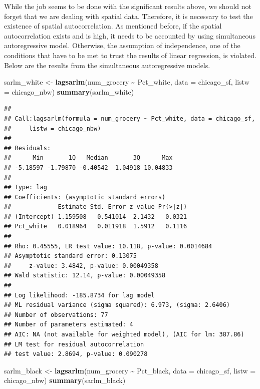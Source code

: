 \documentclass[
]{article}
\newenvironment{Shaded}{\begin{snugshade}}{\end{snugshade}}
\newcommand{\AttributeTok}[1]{\textcolor[rgb]{0.13,0.29,0.53}{#1}}
\newcommand{\FunctionTok}[1]{\textcolor[rgb]{0.13,0.29,0.53}{\textbf{#1}}}
\newcommand{\NormalTok}[1]{#1}
\newcommand{\OtherTok}[1]{\textcolor[rgb]{0.56,0.35,0.01}{#1}}
\newcommand{\SpecialCharTok}[1]{\textcolor[rgb]{0.81,0.36,0.00}{\textbf{#1}}}
\begin{document}
While the job seems to be done with the significant results above, we
should not forget that we are dealing with spatial data. Therefore, it
is necessary to test the existence of spatial autocorrelation. As
mentioned before, if the spatial autocorrelation exists and is high, it
needs to be accounted by using simultaneous autoregressive model.
Otherwise, the assumption of independence, one of the conditions that
have to be met to trust the results of linear regression, is violated.
Below are the results from the simultaneous autoregressive models.

\begin{Shaded}
\begin{Highlighting}[]
\NormalTok{sarlm\_white }\OtherTok{\textless{}{-}} \FunctionTok{lagsarlm}\NormalTok{(num\_grocery }\SpecialCharTok{\textasciitilde{}}\NormalTok{ Pct\_white, }\AttributeTok{data =}\NormalTok{ chicago\_sf, }\AttributeTok{listw =}\NormalTok{ chicago\_nbw)}
\FunctionTok{summary}\NormalTok{(sarlm\_white)}
\end{Highlighting}
\end{Shaded}

\begin{verbatim}
## 
## Call:lagsarlm(formula = num_grocery ~ Pct_white, data = chicago_sf, 
##     listw = chicago_nbw)
## 
## Residuals:
##      Min       1Q   Median       3Q      Max 
## -5.18597 -1.79870 -0.40542  1.04918 10.04833 
## 
## Type: lag 
## Coefficients: (asymptotic standard errors) 
##             Estimate Std. Error z value Pr(>|z|)
## (Intercept) 1.159508   0.541014  2.1432   0.0321
## Pct_white   0.018964   0.011918  1.5912   0.1116
## 
## Rho: 0.45555, LR test value: 10.118, p-value: 0.0014684
## Asymptotic standard error: 0.13075
##     z-value: 3.4842, p-value: 0.00049358
## Wald statistic: 12.14, p-value: 0.00049358
## 
## Log likelihood: -185.8734 for lag model
## ML residual variance (sigma squared): 6.973, (sigma: 2.6406)
## Number of observations: 77 
## Number of parameters estimated: 4 
## AIC: NA (not available for weighted model), (AIC for lm: 387.86)
## LM test for residual autocorrelation
## test value: 2.8694, p-value: 0.090278
\end{verbatim}

\begin{Shaded}
\begin{Highlighting}[]
\NormalTok{sarlm\_black }\OtherTok{\textless{}{-}} \FunctionTok{lagsarlm}\NormalTok{(num\_grocery }\SpecialCharTok{\textasciitilde{}}\NormalTok{ Pct\_black, }\AttributeTok{data =}\NormalTok{ chicago\_sf, }\AttributeTok{listw =}\NormalTok{ chicago\_nbw)}
\FunctionTok{summary}\NormalTok{(sarlm\_black)}
\end{Highlighting}
\end{Shaded}
\end{document}
